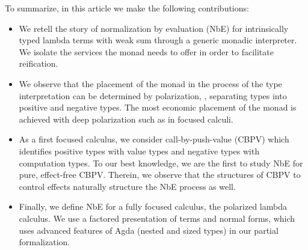 \documentclass[sigconf,screen,fleqn]{acmart} %
\begin{document}
To summarize, in this article we make the following contributions:
\begin{itemize}
\item We retell the story of normalization by evaluation (NbE) for intrinsically
  typed lambda terms with weak sum through a generic monadic
  interpreter.  We isolate the services the monad needs to offer in
  order to facilitate reification.

\item We observe that the placement of the monad in the process of the
  type interpretation can be determined by polarization, \ie,
  separating types into positive and negative types.
  The most economic placement of the monad is achieved with deep
  polarization such as in focused calculi.
\item As a first focused calculus, we consider call-by-push-value
  (CBPV) which identifies positive types with value types and negative
  types with computation types.  To our best knowledge, we are the
  first to study NbE for pure, effect-free CBPV.  Therein, we observe
  that the structures of CBPV to control effects naturally structure
  the NbE process as well.
\item Finally, we define NbE for a fully focused calculus, the
  polarized lambda calculus.
  We use a factored presentation of terms and normal forms,
  which uses advanced features of Agda (nested and sized types)
  in our partial formalization.
\end{itemize}



\end{document}
